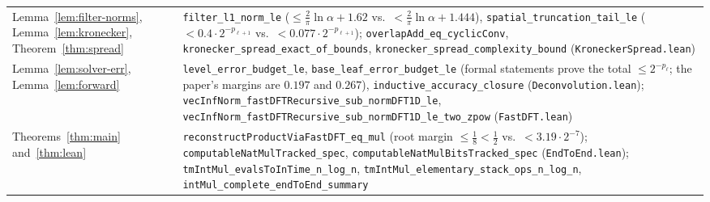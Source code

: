 \begin{table}[!t]
\begin{tabular}{@{}>{\raggedright}p{}>{\raggedright\arraybackslash}p{}@{}}
Lemma~\ref{lem:filter-norms}, Lemma~\ref{lem:kronecker}, Theorem~\ref{thm:spread} & \texttt{filter\_\allowbreak l1\_\allowbreak norm\_\allowbreak le} ($\le \frac{2}{\pi}\ln\alpha + 1.62$ vs.\ $< \frac{2}{\pi}\ln\alpha + 1.444$), \texttt{spatial\_\allowbreak truncation\_\allowbreak tail\_\allowbreak le} ($< 0.4\cdot 2^{-p_{\ell+1}}$ vs.\ $< 0.077\cdot 2^{-p_{\ell+1}}$); \texttt{overlapAdd\_\allowbreak eq\_\allowbreak cyclicConv}, \texttt{kronecker\_\allowbreak spread\_\allowbreak exact\_\allowbreak of\_\allowbreak bounds}, \texttt{kronecker\_\allowbreak spread\_\allowbreak complexity\_\allowbreak bound} (\texttt{Kronecker\allowbreak Spread.lean}) \\\addlinespace[1.5pt]
Lemma~\ref{lem:solver-err}, Lemma~\ref{lem:forward} & \texttt{level\_\allowbreak error\_\allowbreak budget\_\allowbreak le}, \texttt{base\_\allowbreak leaf\_\allowbreak error\_\allowbreak budget\_\allowbreak le} (formal statements prove the total $\le 2^{-p_\ell}$; the paper's margins are $0.197$ and $0.267$), \texttt{inductive\_\allowbreak accuracy\_\allowbreak closure} (\texttt{Deconvolution.lean}); \texttt{vecInfNorm\_\allowbreak fastDFT\allowbreak Recursive\_\allowbreak sub\_\allowbreak normDFT1D\_\allowbreak le}, \texttt{vecInfNorm\_\allowbreak fastDFT\allowbreak Recursive\_\allowbreak sub\_\allowbreak normDFT1D\_\allowbreak le\_\allowbreak two\_\allowbreak zpow} (\texttt{FastDFT.lean}) \\\addlinespace[1.5pt]
Theorems~\ref{thm:main} and~\ref{thm:lean} & \texttt{reconstruct\allowbreak Product\allowbreak Via\allowbreak FastDFT\_\allowbreak eq\_\allowbreak mul} (root margin $\le \frac{1}{8} < \frac{1}{2}$ vs.\ $< 3.19\cdot 2^{-7}$); \texttt{computable\allowbreak NatMul\allowbreak Tracked\_\allowbreak spec}, \texttt{computable\allowbreak NatMul\allowbreak Bits\allowbreak Tracked\_\allowbreak spec} (\texttt{EndToEnd.lean}); \texttt{tmIntMul\_\allowbreak evalsToInTime\_\allowbreak n\_\allowbreak log\_\allowbreak n}, \texttt{tmIntMul\_\allowbreak elementary\_\allowbreak stack\_\allowbreak ops\_\allowbreak n\_\allowbreak log\_\allowbreak n}, \texttt{intMul\_\allowbreak complete\_\allowbreak endToEnd\_\allowbreak summary} \\
\bottomrule
\end{tabular}
\end{table}

